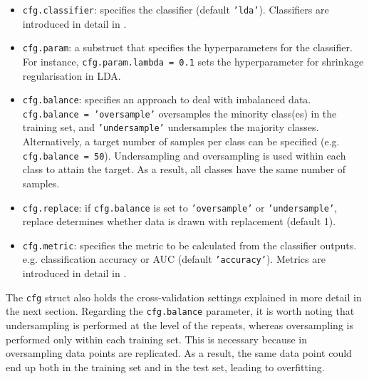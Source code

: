 \documentclass[utf8]{frontiersSCNS} %
\newcommand{\ttt}[1]{\texttt{#1}}
\begin{document}
\begin{itemize}
    \item \ttt{cfg.classifier}: specifies the classifier (default \ttt{'lda'}). Classifiers are introduced in detail in .
    \item \ttt{cfg.param}: a substruct that specifies the hyperparameters for the classifier. For instance, \ttt{cfg.param.lambda = 0.1} sets the hyperparameter for shrinkage regularisation in LDA.
    \item \ttt{cfg.balance}: specifies an approach to deal with imbalanced data. \ttt{cfg.balance = 'oversample'} oversamples the minority class(es) in the training set, and \ttt{'undersample'} undersamples the majority classes. Alternatively, a target number of samples per class can be specified (e.g. \ttt{cfg.balance = 50}). Undersampling and oversampling is used within each class to attain the target. As a result, all classes have the same number of samples.
    \item \ttt{cfg.replace}: if \ttt{cfg.balance} is set to \ttt{'oversample'} or \ttt{'undersample'}, replace determines whether data is drawn with replacement (default 1).
    \item \ttt{cfg.metric}: specifies the metric to be calculated from the classifier outputs. e.g. classification accuracy or AUC (default \ttt{'accuracy'}). Metrics are introduced in detail in .
\end{itemize}

The \ttt{cfg} struct also holds the cross-validation settings explained in more detail in the next section. Regarding the \ttt{cfg.balance} parameter, it is worth noting that undersampling is performed at the level of the repeats, whereas oversampling is performed only within each training set. This is necessary because in oversampling data points are  replicated. As a result, the same data point could end up both in the training set and in the test set, leading to overfitting.

\end{document}
